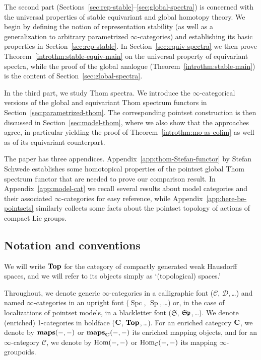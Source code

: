 \documentclass[reqno]{memo-l}
\theoremstyle{mythm}
\theoremstyle{definition}
\numberwithin{equation}{section}
\newcommand{\Cc}{{\mathcal{C}}}
\DeclareMathOperator{\Sp}{Sp}
\DeclareMathOperator{\Spc}{Spc}
\renewcommand{\hom}{\textup{hom}}
\newcommand{\cat}[1]{\textbf{\textup{#1}}}
\newcommand{\maps}{\cat{maps}}
\renewcommand{\hom}{{\textup{Hom}}}
\newcommand{\mySp}{{\mathfrak S\kern-.5pt\mathfrak p}}
\begin{document}
The second part (Sections~\ref{sec:rep-stable}--\ref{sec:global-spectra}) is concerned with the universal properties of stable equivariant and global homotopy theory. We begin by defining the notion of representation stability (as well as a generalization to arbitrary parametrized $\infty$-categories) and establishing its basic properties in Section~\ref{sec:rep-stable}. In Section~\ref{sec:equiv-spectra} we then prove Theorem~\ref{introthm:stable-equiv-main} on the universal property of equivariant spectra, while the proof of the global analogue (Theorem~\ref{introthm:stable-main}) is the content of Section~\ref{sec:global-spectra}.
 
In the third part, we study Thom spectra. We introduce the $\infty$-categorical versions of the global and equivariant Thom spectrum functors in Section~\ref{sec:parametrized-thom}. The corresponding pointset construction is then discussed in Section~\ref{sec:model-thom}, where we also show that the approaches agree, in particular yielding the proof of Theorem~\ref{introthm:mo-as-colim} as well as of its equivariant counterpart.

The paper has three appendices. Appendix~\ref{app:thom-Stefan-functor} by Stefan Schwede establishes some homotopical properties of the pointset global Thom spectrum functor that are needed to prove our comparison result. In Appendix~\ref{app:model-cat} we recall several results about model categories and their associated $\infty$-categories for easy reference, while Appendix~\ref{app:here-be-pointsets} similarly collects some facts about the pointset topology of actions of compact Lie groups. 

\subsection*{Notation and conventions} We will write $\cat{Top}$ for the category of compactly generated weak Hausdorff spaces, and we will refer to its objects simply as `(topological) spaces.'

Throughout, we denote generic $\infty$-categories in a calligraphic font ($\mathcal C$, $\mathcal D$,\,\dots) and named $\infty$-categories in an upright font ($\Spc$, $\Sp$,\,\dots) or, in the case of localizations of pointset models, in a blackletter font ($\mathfrak S$, $\mySp$,\,\dots). We denote (enriched) 1-categories in boldface ($\cat{C}$, $\cat{Top}$,\,\dots). 
For an enriched category $\cat{C}$, we denote by $\maps(-,-)$ or $\maps_{\cat{C}}(-,-)$ its enriched mapping objects, and for an $\infty$-category $\Cc$, we denote by $\hom(-,-)$ or $\hom_{\Cc}(-,-)$ its mapping $\infty$-groupoids. 
\end{document}
